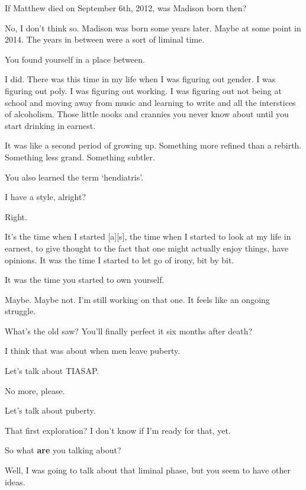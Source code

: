 \begin{ally}
If Matthew died on September 6th, 2012, was Madison born then?
\end{ally}
No, I don't think so. Madison was born some years later. Maybe at some point in 2014. The years in between were a sort of liminal time.

\begin{ally}
You found yourself in a place between.
\end{ally}
I did. There was this time in my life when I was figuring out gender. I was figuring out poly. I was figuring out working. I was figuring out not being at school and moving away from music and learning to write and all the interstices of alcoholism. Those little nooks and crannies you never know about until you start drinking in earnest.

It was like a second period of growing up. Something more refined than a rebirth. Something less grand. Something subtler.

\begin{ally}
You also learned the term `hendiatris'.
\end{ally}
I have a style, alright?

\begin{ally}
Right.
\end{ally}
It's the time when I started {[}a{]}{[}s{]}, the time when I started to look at my life in earnest, to give thought to the fact that one might actually enjoy things, have opinions. It was the time I started to let go of irony, bit by bit.

\begin{ally}
It was the time you started to own yourself.
\end{ally}
Maybe. Maybe not. I'm still working on that one. It feels like an ongoing struggle.

\begin{ally}
What's the old saw? You'll finally perfect it six months after death?
\end{ally}
I think that was about when men leave puberty.

\begin{ally}
Let's talk about TIASAP.
\end{ally}
No more, please.

\begin{ally}
Let's talk about puberty.
\end{ally}
That first exploration? I don't know if I'm ready for that, yet.

\begin{ally}
So what \textbf{are} you talking about?
\end{ally}
Well, I was going to talk about that liminal phase, but you seem to have other ideas.

